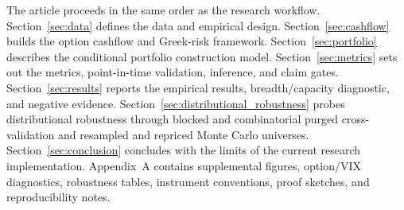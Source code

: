 The article proceeds in the same order as the research workflow.
Section~\ref{sec:data} defines the data and empirical design.
Section~\ref{sec:cashflow} builds the option cashflow and Greek-risk framework.
Section~\ref{sec:portfolio} describes the conditional portfolio construction model.
Section~\ref{sec:metrics} sets out the metrics, point-in-time validation, inference, and
claim gates. Section~\ref{sec:results} reports the empirical results, breadth/capacity
diagnostic, and negative evidence.
Section~\ref{sec:distributional_robustness} probes distributional robustness through blocked
and combinatorial purged cross-validation and resampled and repriced Monte Carlo universes.
Section~\ref{sec:conclusion} concludes with the limits of the current research
implementation. Appendix~A contains supplemental figures, option/VIX diagnostics,
robustness tables, instrument conventions, proof sketches, and reproducibility notes.
